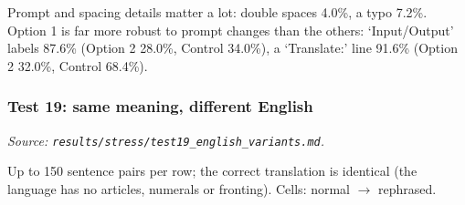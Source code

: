 \documentclass[10pt,a4paper,oneside]{article}
\begin{document}
\begin{infer}Prompt and spacing details matter a lot: double spaces 4.0\%, a typo 7.2\%. Option 1 is far more robust to
prompt changes than the others: `Input/Output' labels 87.6\% (Option 2 28.0\%, Control 34.0\%), a `Translate:'
line 91.6\% (Option 2 32.0\%, Control 68.4\%).\end{infer}
\subsubsection{Test 19: same meaning, different English}
\textit{Source: \texttt{results/stress/test19\_english\_variants.md}.}


Up to 150 sentence pairs per row; the correct translation is identical (the language has no articles, numerals or fronting). Cells: normal $\rightarrow$ rephrased.
\end{document}
